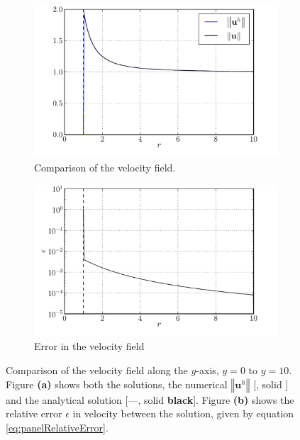 	\begin{figure}[p]
     \centering
     \begin{subfigure}[b]{0.45\textwidth}
             \includegraphics[width=\textwidth]{figures/lagrangian/panelCylinder_versusAnalytical.pdf}
             \caption{Comparison of the velocity field.}
             \label{fig:panelCylinder_versusAnalytical}
     \end{subfigure}%
     \qquad %
     \begin{subfigure}[b]{0.45\textwidth}
             \includegraphics[width=\textwidth]{figures/lagrangian/panelCylinder_error.pdf}
             \caption{Error in the velocity field}
             \label{fig:panelCylinder_error}
     \end{subfigure}
     \caption{Comparison of the velocity field along the $y$-axis, $y=0$ to $y=10$. Figure \textbf{(a)} shows both the solutions, the numerical $\left\Vert\mathbf{u}^h\right\Vert$ [{\color{plotBlue}{---}}, solid {}] and the analytical solution [---, solid \textbf{black}]. Figure \textbf{(b)} shows the relative error $\epsilon$ in velocity between the solution, given by equation \ref{eq:panelRelativeError}.}
     \label{fig:panelCylinderComparision}
	\end{figure}

